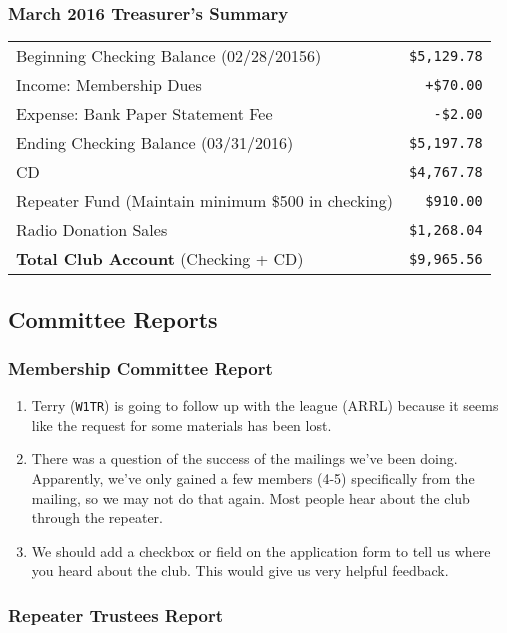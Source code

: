 \documentclass[10pt,letterpaper]{article}
\begin{document}
\subsubsection{March 2016 Treasurer's Summary}
\noindent
\begin{tabular}{|l|r|}
  \hline
  Beginning Checking Balance (02/28/20156) & \texttt{\$5,129.78} \\
  Income: Membership Dues & \texttt{+\$70.00} \\
  Expense: Bank Paper Statement Fee & \texttt{-\$2.00} \\
  Ending Checking Balance (03/31/2016) & \texttt{\$5,197.78} \\
  \hline
  \hline
  CD & \texttt{\$4,767.78} \\
  \hline
  \hline
  Repeater Fund (Maintain minimum \$500 in checking) & \texttt{\$910.00} \\
  \hline
  \hline
  Radio Donation Sales & \texttt{\$1,268.04} \\
  \hline
  \hline
  \textbf{Total Club Account} (Checking + CD) & \texttt{\$9,965.56} \\
  \hline
\end{tabular}

\subsection{Committee Reports}

\subsubsection{Membership Committee Report}

\begin{enumerate}
\item Terry (\texttt{W1TR}) is going to follow up with the league (ARRL) because it seems like the request for some materials has been lost.
\item There was a question of the success of the mailings we've been doing. Apparently, we've only gained a few members (4-5) specifically from the mailing, so we may not do that again. Most people hear about the club through the repeater.
\item We should add a checkbox or field on the application form to tell us where you heard about the club. This would give us very helpful feedback.
\end{enumerate}

\subsubsection{Repeater Trustees Report}
\end{document}
